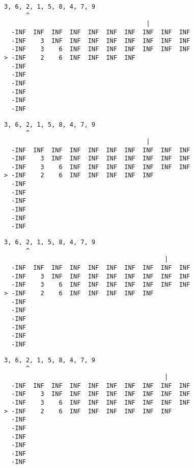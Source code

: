 { \begin{verbatim}
3, 6, 2, 1, 5, 8, 4, 7, 9
      ^
                                       |
  -INF  INF  INF  INF  INF  INF  INF  INF  INF  INF
  -INF    3  INF  INF  INF  INF  INF  INF  INF  INF
  -INF    3    6  INF  INF  INF  INF  INF  INF  INF
> -INF    2    6  INF  INF  INF  INF               
  -INF                                             
  -INF                                             
  -INF                                             
  -INF                                             
  -INF                                             
  -INF                                             
\end{verbatim} }

{ \begin{verbatim}
3, 6, 2, 1, 5, 8, 4, 7, 9
      ^
                                       |
  -INF  INF  INF  INF  INF  INF  INF  INF  INF  INF
  -INF    3  INF  INF  INF  INF  INF  INF  INF  INF
  -INF    3    6  INF  INF  INF  INF  INF  INF  INF
> -INF    2    6  INF  INF  INF  INF  INF          
  -INF                                             
  -INF                                             
  -INF                                             
  -INF                                             
  -INF                                             
  -INF                                             
\end{verbatim} }

{ \begin{verbatim}
3, 6, 2, 1, 5, 8, 4, 7, 9
      ^
                                            |
  -INF  INF  INF  INF  INF  INF  INF  INF  INF  INF
  -INF    3  INF  INF  INF  INF  INF  INF  INF  INF
  -INF    3    6  INF  INF  INF  INF  INF  INF  INF
> -INF    2    6  INF  INF  INF  INF  INF          
  -INF                                             
  -INF                                             
  -INF                                             
  -INF                                             
  -INF                                             
  -INF                                             
\end{verbatim} }

{ \begin{verbatim}
3, 6, 2, 1, 5, 8, 4, 7, 9
      ^
                                            |
  -INF  INF  INF  INF  INF  INF  INF  INF  INF  INF
  -INF    3  INF  INF  INF  INF  INF  INF  INF  INF
  -INF    3    6  INF  INF  INF  INF  INF  INF  INF
> -INF    2    6  INF  INF  INF  INF  INF  INF     
  -INF                                             
  -INF                                             
  -INF                                             
  -INF                                             
  -INF                                             
  -INF                                             
\end{verbatim} }

